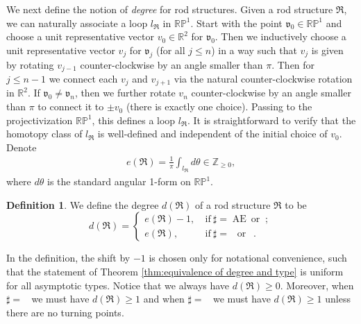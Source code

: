 \documentclass[a4paper,11pt]{amsart}
\theoremstyle{definition}
\newtheorem{definition}[theorem]{Definition}
\numberwithin{equation}{section}
\newcommand{\R}{\mathbb{R}}
\newcommand{\mv} {\mathfrak v}
\newcommand{\mR} {\mathfrak R}
\DeclareMathOperator{\Ae}{AE}
\DeclareMathOperator{\ALFp}{ALF^+}
\DeclareMathOperator{\ALFm}{ALF^{--}}
\DeclareMathOperator{\AFa}{AF_\beta}
\begin{document}
We next define the notion of \emph{degree} for rod structures. Given a rod structure $\mathfrak{R}$, we can naturally associate a loop $l_\mathfrak{R}$ in $\mathbb{RP}^1$. Start with the point $\mathfrak{v}_0\in \R\mathbb P^1$ and choose a unit representative vector $v_0\in\mathbb{R}^2$ for $\mv_0$. Then we inductively choose a unit representative vector $v_j$ for $\mathfrak{v}_j$ (for all $j\leq n$) in a way such that $v_j$ is given by rotating $v_{j-1}$ counter-clockwise by an angle smaller than $\pi$. Then for $j\leq n-1$ we connect each $v_j$ and $v_{j+1}$ via the natural counter-clockwise rotation in $\mathbb{R}^2$. If $\mathfrak{v}_0\neq\mathfrak{v}_n$, then we further rotate $v_n$ counter-clockwise by an angle smaller than $\pi$ to connect it to $\pm v_0$ (there is exactly one choice). Passing to the projectivization $\mathbb{RP}^1$, this defines a loop $l_{\mathfrak R}$. It is straightforward to verify that the homotopy class of $l_{\mathfrak{R}}$ is well-defined and independent of the initial choice of $v_0$.
Denote
    \begin{align}
        e(\mathfrak{R})=\frac{1}{\pi}\int_{l_{\mathfrak R}}d\theta\in\mathbb{Z}_{\geq0},
    \end{align}
where $d\theta$ is the standard angular 1-form on $\R\mathbb P^1$.
\begin{definition}\label{def:degrees}
 We define the degree $d(\mathfrak{R})$ of a rod structure $\mathfrak{R}$ to be 
\begin{equation}
    d(\mR)=\begin{cases}
        e(\mR)-1, &\ \text{if}\ \sharp=\Ae \ \text{or}  \ALFp;\\
        e(\mR), &\ \text{if}\ \sharp= \ALFm \ \text{or} \ \AFa.
    \end{cases}
\end{equation}
    
\end{definition}
 In the definition, the shift by $-1$ is chosen only for notational convenience, such that the statement of Theorem \ref{thm:equivalence of degree and type} is uniform for all  asymptotic types. Notice that we always have $d(\mR)\geq 0$. Moreover, when $\sharp=\ALFm$ we must have $d(\mR)\geq 1$ and when $\sharp=\AFa$ we must have $d(\mR)\geq 1$ unless there are no turning points. 
\end{document}

